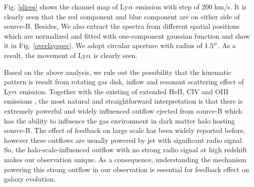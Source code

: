 \documentclass[../Results.tex]{subfiles}
\begin{document}
Fig. \ref{slices} shows the channel map of Ly$\rm \alpha$ emission with step of 200 km/s. It is clearly seen that the red component and blue component are on either side of source-B. Besides, We also extract the spectra from different spatial positions which are normalized and fitted with one-component gaussian function and show it in Fig. \ref{overlayspec}. We adopt circular aperture with radius of $\rm 1.5 \mbox{$^{\prime\prime}$}$. As a result, the movement of Ly$\rm \alpha$ is clearly seen.

Based on the above analysis, we rule out the possibility that the kinematic pattern is result from rotating gas disk, inflow and resonant scattering effect of Ly$\rm \alpha$ emission. Together with the existing of extended HeII, CIV and OIII emissions \citep{cai2017discovery}, the most natural and straightforward interpretation is that there is extremely powerful and widely influenced outflow ejected from source-B which has the ability to influence the gas environment in dark matter halo hosting source-B. The effect of feedback on large scale has been widely reported before, however these outflows are usually powered by jet with significant radio signal. So, the halo-scale-influenced outflow with no strong radio signal at high redshift makes our observation unique. As a consequence, understanding the mechanism powering this strong outflow in our observation is essential for feedback effect on galaxy evolution.  
\end{document}
